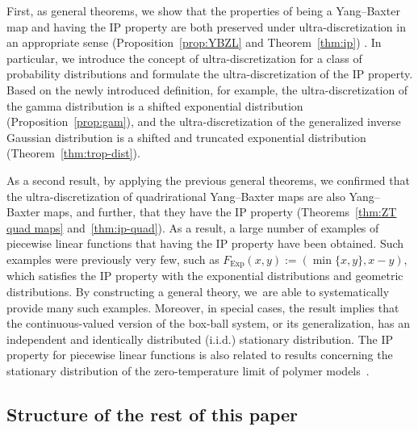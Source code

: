 \documentclass[pdftex]{sigma}
\numberwithin{equation}{section}
\begin{document}
First, as general theorems, we show that the properties of being a Yang--Baxter map and having the IP property are both preserved under ultra-discretization in an appropriate sense (Proposition~\ref{prop:YBZL} and Theorem~\ref{thm:ip}) . In particular, we introduce the concept of ultra-discretization for a class of probability distributions and formulate the ultra-discretization of the IP property. Based on the newly introduced definition, for example, the ultra-discretization of the gamma distribution is a shifted exponential distribution (Proposition~\ref{prop:gam}), and the ultra-discretization of the generalized inverse Gaussian distribution is a shifted and truncated exponential distribution (Theorem~\ref{thm:trop-dist}).

As a second result, by applying the previous general theorems, we confirmed that the ultra-discretization of quadrirational Yang--Baxter maps are also Yang--Baxter maps, and further, that they have the IP property (Theorems~\ref{thm:ZT quad maps} and~\ref{thm:ip-quad}). As a result, a large number of examples of piecewise linear functions that having the IP property have been obtained. Such examples were previously very few, such as $F_{\mathrm{Exp}}(x,y):=(\min\{x,y\},x-y)$, which satisfies the IP property with the exponential distributions and geometric distributions. By constructing a general theory, we~are able to systematically provide many such examples. Moreover, in special cases, the result implies that the continuous-valued version of the box-ball system, or its generalization, has an independent and identically distributed (i.i.d.) stationary distribution. The IP property for piecewise linear functions is also related to results concerning the stationary distribution of the zero-temperature limit of polymer models~\cite{CSjsp}.

\subsection{Structure of the rest of this paper}
\end{document}
